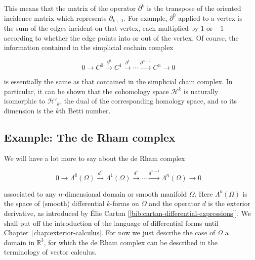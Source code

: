 {This means that the matrix of the operator $\partial^k$ is the transpose of the oriented incidence matrix which represents $\partial_{k+1}$. For example, $\partial^0$ applied to a vertex is the sum of the edges incident on that vertex, each multiplied by $1$ or $-1$ according to whether the edge points into or out of the vertex. Of course, the information contained in the simplicial cochain complex}

\begin{equation}\label{eq:simplicial-cochain-complex}
0\to C^0\xrightarrow{\partial^0}C^1\xrightarrow{\partial^1}\cdots\xrightarrow{\partial^{n-1}}C^n\to0
\end{equation}

{is essentially the same as that contained in the simplicial chain complex. In particular, it can be shown that the cohomology space $\mathcal H^k$ is naturally isomorphic to $\mathcal H'_k$, the dual of the corresponding homology space, and so its dimension is the $k$th Betti number.}

\subsection{{Example: The de Rham complex}}\label{sec:de-rham-complex}

{We will have a lot more to say about the de Rham complex}

\begin{equation}\label{eq:differential-forms-de-rham-complex}
0\to\Lambda^0(\Omega)\xrightarrow{d^0}\Lambda^1(\Omega)\xrightarrow{d^1}\cdots\xrightarrow{d^{n-1}}\Lambda^n(\Omega)\to0
\end{equation}

{associated to any $n$-dimensional domain or smooth manifold $\Omega$. Here $\Lambda^k(\Omega)$ is the space of (smooth) differential $k$-forms on $\Omega$ and the operator $d$ is the exterior derivative, as introduced by Élie Cartan [\ref{bib:cartan-differential-expressions}]. We shall put off the introduction of the language of differential forms until Chapter~\ref{chap:exterior-calculus}. For now we just describe the case of $\Omega$ a domain in $\mathbb R^3$, for which the de Rham complex can be described in the terminology of vector calculus.}

